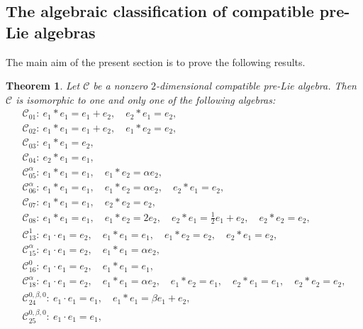 \documentclass[10pt,a4paper]{amsart}
\numberwithin{equation}{section}
\newtheorem{Theorem}{Theorem}[section]
\begin{document}
\subsection{The algebraic classification of compatible pre-Lie algebras}
The main aim of the present section is to prove the following results.


\begin{Theorem}
\label{compre2} Let $\mathcal{C}$ be a nonzero $2$-dimensional compatible pre-Lie algebra.
Then $\mathcal{C}$ is isomorphic to one {and only one} of the following
algebras:
\begin{gather*}
 \mathcal{C}_{01} \colon\ e_{1} \ast e_{1} = e_{1} + e_{2},\quad e_{2} \ast e_{1} =e_{2},\\
 \mathcal{C}_{02} \colon\ e_{1}\ast e_{1} = e_{1} + e_{2}, \quad e_{1}\ast e_{2} =e_{2}, \\
 \mathcal{C}_{03} \colon\ e_{1}\ast e_{1} =e_{2},\\
 \mathcal{C}_{04} \colon\ e_{2} \ast e_{1} =e_{1}, \\
 \mathcal{C}_{05}^{\alpha} \colon\ e_{1}\ast e_{1} =e_{1},\quad e_{1}\ast e_{2} = \alpha e_{2}, \\
 \mathcal{C}_{06}^{\alpha} \colon\ e_{1} \ast e_{1} =e_{1}, \quad e_{1} \ast e_{2} = \alpha e_{2}, \quad e_{2} \ast e_{1} =e_{2}, \\
 \mathcal{C}_{07} \colon\ e_{1}\ast e_{1} =e_{1},\quad e_{2}\ast e_{2}=e_{2}, \\
 \mathcal{C}_{08} \colon\ e_{1}\ast e_{1} =e_{1}, \quad e_{1}\ast e_{2} = 2 e_{2},\quad e_{2}\ast e_{1} =\tfrac{1}{2} e_{1} + e_2, \quad e_{2}\ast e_{2}=e_{2}, \\
 \mathcal{C}_{13}^{1 }\colon\
e_{1}\cdot e_{1}=e_{2}, \quad
e_{1}\ast e_{1}= e_{1},\quad e_{1}\ast e_{2}=e_{2},\quad e_{2}\ast
e_{1}= e_{2},
\\
 \mathcal{C}_{15}^{\alpha }\colon\
 e_{1}\cdot e_{1}=e_{2}, \quad
 e_{1}\ast e_{1}=\alpha e_{2},
\\
 \mathcal{C}_{16}^{0 }\colon\
 e_{1}\cdot e_{1}=e_{2}, \quad
 e_{1}\ast e_{1}=e_{1},
\\
 \mathcal{C}_{18}^{\alpha }\colon\
 e_{1}\cdot e_{1}=e_{2}, \quad
 e_{1}\ast e_{1}=\alpha e_{2},\quad e_{1}\ast e_{2}=e_{1},\quad e_{2}\ast
e_{1}=e_{1}, \quad e_{2}\ast e_{2}=e_{2},
\\
 \mathcal{C}_{24}^{0 ,\beta ,0 }\colon\
 e_{1}\cdot e_{1}=e_{1}, \quad
 e_{1}\ast e_{1}=\beta e_{1}+e_{2},
\\
 \mathcal{C}_{25}^{0 ,\beta ,0 }\colon\
 e_{1}\cdot e_{1}=e_{1}, \quad

\end{gather*}
\end{Theorem}
\end{document}
